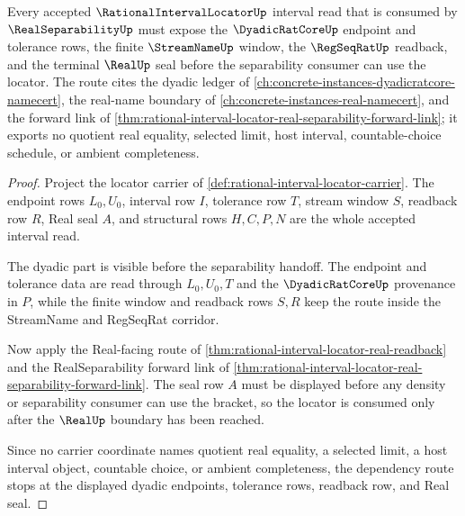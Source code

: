 \begin{theorem}
\label{thm:rational-interval-locator-dyadic-real-route}
Every accepted $\RationalIntervalLocatorUp$ interval read that is consumed by $\RealSeparabilityUp$ must expose the $\DyadicRatCoreUp$ endpoint and tolerance rows, the finite $\StreamNameUp$ window, the $\RegSeqRatUp$ readback, and the terminal $\RealUp$ seal before the separability consumer can use the locator. The route cites the dyadic ledger of \autoref{ch:concrete-instances-dyadicratcore-namecert}, the real-name boundary of \autoref{ch:concrete-instances-real-namecert}, and the forward link of \autoref{thm:rational-interval-locator-real-separability-forward-link}; it exports no quotient real equality, selected limit, host interval, countable-choice schedule, or ambient completeness.
\end{theorem}
\begin{proof}
Project the locator carrier of \autoref{def:rational-interval-locator-carrier}. The endpoint rows $L_0,U_0$, interval row $I$, tolerance row $T$, stream window $S$, readback row $R$, Real seal $A$, and structural rows $H,C,P,N$ are the whole accepted interval read.

The dyadic part is visible before the separability handoff. The endpoint and tolerance data are read through $L_0,U_0,T$ and the $\DyadicRatCoreUp$ provenance in $P$, while the finite window and readback rows $S,R$ keep the route inside the StreamName and RegSeqRat corridor.

Now apply the Real-facing route of \autoref{thm:rational-interval-locator-real-readback} and the RealSeparability forward link of \autoref{thm:rational-interval-locator-real-separability-forward-link}. The seal row $A$ must be displayed before any density or separability consumer can use the bracket, so the locator is consumed only after the $\RealUp$ boundary has been reached.

Since no carrier coordinate names quotient real equality, a selected limit, a host interval object, countable choice, or ambient completeness, the dependency route stops at the displayed dyadic endpoints, tolerance rows, readback row, and Real seal.
\end{proof}
